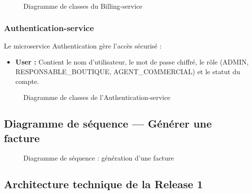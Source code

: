 \begin{figure}[H]
    \centering
    \caption{Diagramme de classes du Billing-service}
    \label{fig:class_billing}
\end{figure}

\subsubsection{Authentication-service}
Le microservice Authentication gère l'accès sécurisé :
\begin{itemize}
    \item \textbf{User :} Contient le nom d'utilisateur, le mot de passe chiffré, le rôle (ADMIN, RESPONSABLE\_BOUTIQUE, AGENT\_COMMERCIAL) et le statut du compte.
\end{itemize}

\begin{figure}[H]
    \centering
    \caption{Diagramme de classes de l'Authentication-service}
    \label{fig:class_auth}
\end{figure}

\subsection{Diagramme de séquence --- Générer une facture}

\begin{figure}[H]
    \centering
    \caption{Diagramme de séquence : génération d'une facture}
    \label{fig:seq_invoice}
\end{figure}

\subsection{Architecture technique de la Release 1}


